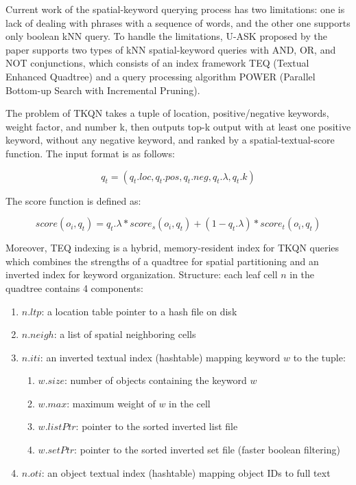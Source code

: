 \documentclass[]{IEEEphot}
\begin{document}
Current work of the spatial-keyword querying process has two limitations: one is lack of dealing with phrases with a sequence of words, and the other one supports only boolean kNN query. To handle the limitations, U-ASK proposed by the paper supports two types of kNN spatial-keyword queries with AND, OR, and NOT conjunctions, which consists of an index framework TEQ (Textual Enhanced Quadtree) and a query processing algorithm POWER (Parallel Bottom-up Search with Incremental Pruning).

The problem of TKQN takes a tuple of location, positive/negative keywords, weight factor, and number k, then outputs top-k output with at least one positive keyword, without any negative keyword, and ranked by a spatial-textual-score function. The input format is as follows:

$$q_t = (q_t.loc, q_t.pos, q_t.neg, q_t.\lambda, q_t.k)$$

The score function is defined as:

$$score(o_i, q_t) = q_t.\lambda * score_s(o_i, q_t) + (1 - q_t.\lambda) * score_t(o_i, q_t)$$

Moreover, TEQ indexing is a hybrid, memory-resident index for TKQN queries which combines the strengths of a quadtree for spatial partitioning and an inverted index for keyword organization. Structure: each leaf cell $n$ in the quadtree contains 4 components:

\begin{enumerate}
    \item $n.ltp$: a location table pointer to a hash file on disk
    \item $n.neigh$: a list of spatial neighboring cells
    \item $n.iti$: an inverted textual index (hashtable) mapping keyword $w$ to the tuple:
    \begin{enumerate}
        \item $w.size$: number of objects containing the keyword $w$
        \item $w.max$: maximum weight of $w$ in the cell
        \item $w.listPtr$: pointer to the sorted inverted list file
        \item $w.setPtr$: pointer to the sorted inverted set file (faster boolean filtering)
    \end{enumerate}
    \item $n.oti$: an object textual index (hashtable) mapping object IDs to full text
\end{enumerate}
\end{document}
